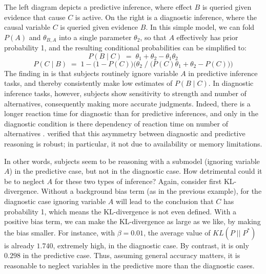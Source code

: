 \documentclass[10pt,letterpaper]{article}
\begin{document}
The left diagram depicts a predictive inference, where effect $B$ is queried given evidence that cause $C$ is active. On the right is a diagnostic inference, where the causal variable $C$ is queried given evidence $B$. In this simple model, we can fold $P(A)$ and $\theta_{B,A}$ into a single parameter $\theta_2$, so that $A$ effectively has prior probability 1, and the resulting conditional probabilities can be simplified to: 
$$P(B\mid C) \;= \; \theta_1 + \theta_2 - \theta_1\theta_2$$
$$P(C \mid B) \;= \; 1- \big(1-P(C)\big)\Big(\theta_2\;/\;\big(P(C)\theta_1 + \theta_2  - P(C)\big)\Big)$$
The finding in \cite{Fernbach2011} is that subjects routinely ignore variable $A$ in predictive inference tasks, and thereby consistently make low estimates of $P(B\mid C)$. In diagnostic inference tasks, however, subjects show sensitivity to strength and number of alternatives, consequently making more accurate judgments. Indeed, there is a longer reaction time for diagnostic than for predictive inferences, and only in the diagnostic condition is there dependency of reaction time on number of alternatives \citep{Fernbach2010}. \cite{Fernbach2013} verified that this asymmetry between diagnostic and predictive reasoning is robust; in particular, it not due to availability or memory limitations.

In other words, subjects seem to be reasoning with a submodel (ignoring variable $A$) in the predictive case, but not in the diagnostic case. How detrimental could it be to neglect $A$ for these two types of inference? Again, consider first KL-divergence. Without a background bias term (as in the previous example), for the diagnostic case ignoring variable $A$ will lead to the conclusion that $C$ has probability 1, which means the KL-divergence is not even defined. With a positive bias term, we can make the KL-divergence as large as we like, by making the bias smaller. For instance, with $\beta = 0.01$, the average value of $KL(P\;||\;P^*)$ is already $1.740$, extremely high, in the diagnostic case. By contrast, it is only $0.298$ in the predictive case. Thus, assuming general accuracy matters, it is reasonable to neglect variables in the predictive more than the diagnostic cases.
\end{document}
